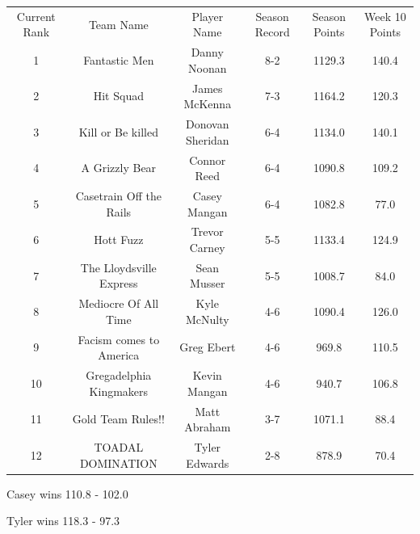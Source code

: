 \documentclass[11pt,letterpaper]{article}
\begin{document}
\newpage
{}
\vspace{-25pt}
\begin{table} [h]
\footnotesize
\begin{center}
\begin{tabular} { c c c c c c }
\\[3mm] Current Rank & Team Name & Player Name & Season Record &  Season Points & Week 10 Points
\\[3mm] 1 & Fantastic Men & Danny Noonan & 8-2 & 1129.3 & 140.4
\\ 2 & Hit Squad & James McKenna & 7-3 & 1164.2 & 120.3
\\ 3 & Kill or Be killed & Donovan Sheridan & 6-4 & 1134.0 & 140.1
\\ 4 & A Grizzly Bear & Connor Reed & 6-4 & 1090.8 & 109.2
\\ 5 & Casetrain Off the Rails & Casey Mangan & 6-4 & 1082.8 & 77.0
\\ 6 & Hott Fuzz & Trevor Carney & 5-5 & 1133.4 & 124.9
\\ 7 & The Lloydsville Express & Sean Musser & 5-5 & 1008.7 & 84.0
\\ 8 & Mediocre Of All Time & Kyle McNulty & 4-6 & 1090.4 & 126.0
\\ 9 & Facism comes to America & Greg Ebert & 4-6 & 969.8 & 110.5
\\ 10 & Gregadelphia Kingmakers & Kevin Mangan & 4-6 & 940.7 & 106.8
\\ 11 & Gold Team Rules!! & Matt Abraham & 3-7 & 1071.1 & 88.4
\\ 12 & TOADAL DOMINATION & Tyler Edwards & 2-8 & 878.9 & 70.4
\end{tabular}
\end{center}
\end{table}


\newpage
{}



\par\noindent Casey wins 110.8 - 102.0
\bigskip
\par\noindent



{}
\par\noindent Tyler wins 118.3 - 97.3
\bigskip
\par\noindent
\end{document}

